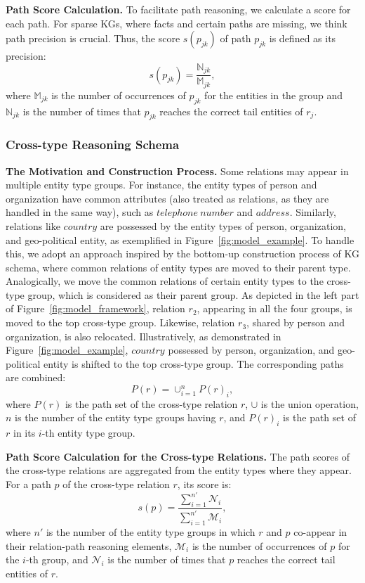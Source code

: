 \documentclass[sigconf]{acmart}
\begin{document}
\textbf{Path Score Calculation.}
To facilitate path reasoning, we calculate a score for each path. For sparse KGs, where facts and certain paths are missing, we think path precision is crucial. Thus, the score $s(p_{jk})$ of path $p_{jk}$ is defined as its precision:
\begin{equation}
	s(p_{jk}) = \frac{\mathbb{N}_{jk}}{\mathbb{M}_{jk}},
\end{equation}
where $\mathbb{M}_{jk}$ is the number of occurrences of $p_{jk}$ for the entities in the group and $\mathbb{N}_{jk}$ is the number of times that $p_{jk}$ reaches the correct tail entities of $r_j$. 

\subsubsection{Cross-type Reasoning Schema}
\textbf{The Motivation and Construction Process.} Some relations may appear in multiple entity type groups. For instance, the entity types of person and organization have common attributes (also treated as relations, as they are handled in the same way), such as $telephone\ number$ and $address$. Similarly, relations like $country$ are possessed by the entity types of person, organization, and geo-political entity, as exemplified in Figure~\ref{fig:model_example}. To handle this, we adopt an approach inspired by the bottom-up construction process of KG schema, where common relations of entity types are moved to their parent type. Analogically, we move the common relations of certain entity types to the cross-type group, which is considered as their parent group. As depicted in the left part of Figure~\ref{fig:model_framework}, relation $r_2$, appearing in all the four groups, is moved to the top cross-type group. Likewise, relation $r_3$, shared by person and organization, is also relocated. Illustratively, as demonstrated in Figure~\ref{fig:model_example}, $country$ possessed by person, organization, and geo-political entity is shifted to the top cross-type group. The corresponding paths are combined:
\begin{equation}
	P(r) = \cup_{i=1}^n P(r)_i,
\end{equation}
where $P(r)$ is the path set of the cross-type relation $r$, $\cup$ is the union operation, $n$ is the number of the entity type groups having $r$, and $P(r)_i$ is the path set of $r$ in its $i$-th entity type group.

\textbf{Path Score Calculation for the Cross-type Relations.}
The path scores of the cross-type relations are aggregated from the entity types where they appear. For a path $p$ of the cross-type relation $r$, its score is:
\begin{equation}
	s(p) = \frac{\sum_{i=1}^{n'} {\mathcal N}_i}{\sum_{i=1}^{n'} {\mathcal M}_i},
\end{equation}
where $n'$ is the number of the entity type groups in which $r$ and $p$ co-appear in their relation-path reasoning elements, ${\mathcal M}_i$ is the number of occurrences of $p$ for the $i$-th group, and ${\mathcal N}_i$ is the number of times that $p$ reaches the correct tail entities of $r$.
\end{document}
